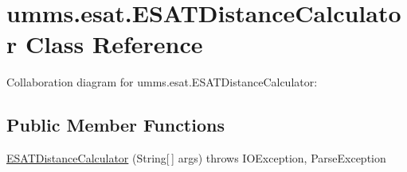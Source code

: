 \hypertarget{classumms_1_1esat_1_1_e_s_a_t_distance_calculator}{\section{umms.\+esat.\+E\+S\+A\+T\+Distance\+Calculator Class Reference}
\label{classumms_1_1esat_1_1_e_s_a_t_distance_calculator}
}


Collaboration diagram for umms.\+esat.\+E\+S\+A\+T\+Distance\+Calculator\+:
\subsection*{Public Member Functions}
\begin{DoxyCompactItemize}
\item 
\hyperlink{classumms_1_1esat_1_1_e_s_a_t_distance_calculator_a37e6c5de3998706091a6aef23e96144e}{E\+S\+A\+T\+Distance\+Calculator} (String\mbox{[}$\,$\mbox{]} args)  throws I\+O\+Exception, Parse\+Exception 
\end{DoxyCompactItemize}
